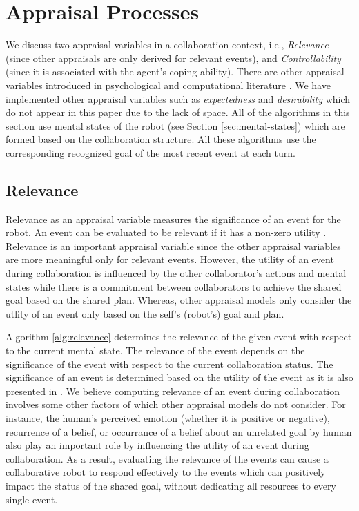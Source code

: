 \documentclass{article}
\begin{document}
\vspace*{-3mm}
\section{Appraisal Processes}
\label{sec:appraisal-process}

We discuss two appraisal variables in a collaboration context, i.e.,
\textit{Relevance} (since other appraisals are only derived for relevant
events), and \textit{Controllability} (since it is associated with the agent's
coping ability). There are other appraisal variables introduced in psychological
\cite{scherer:appraisal-processes} and computational literature
\cite{gratch:domain-independent}. We have implemented other appraisal variables
such as \textit{expectedness} \cite{shayganfar:appraisal-short} and
\textit{desirability} which do not appear in this paper due to the lack of
space. All of the algorithms in this section use mental states of the robot (see
Section \ref{sec:mental-states}) which are formed based on the collaboration
structure. All these algorithms use the corresponding recognized goal of the
most recent event at each turn.

\subsection{Relevance}

Relevance as an appraisal variable measures the significance of an event for the
robot. An event can be evaluated to be relevant if it has a non-zero utility
\cite{marsella:ema-process-model}. Relevance is an important appraisal variable
since the other appraisal variables are more meaningful only for relevant
events. However, the utility of an event during collaboration is influenced by
the other collaborator's actions and mental states while there is a commitment
between collaborators to achieve the shared goal based on the shared plan.
Whereas, other appraisal models only consider the utlity of an event only based
on the self's (robot's) goal and plan. 

Algorithm \ref{alg:relevance} determines the relevance of the given event with
respect to the current mental state. The relevance of the event depends on the
significance of the event with respect to the current collaboration status.
The significance of an event is determined based on the utility of the event as
it is also presented in
\cite{gratch:domain-independent,marsella:ema-process-model}. We believe
computing relevance of an event during collaboration involves some other factors
of which other appraisal models do not consider. For instance, the human's
perceived emotion (whether it is positive or negative), recurrence of a belief,
or occurrance of a belief about an unrelated goal by human also play an
important role by influencing the utility of an event during collaboration. As a
result, evaluating the relevance of the events can cause a collaborative robot
to respond effectively to the events which can positively impact the status of
the shared goal, without dedicating all resources to every single event.
\end{document}

